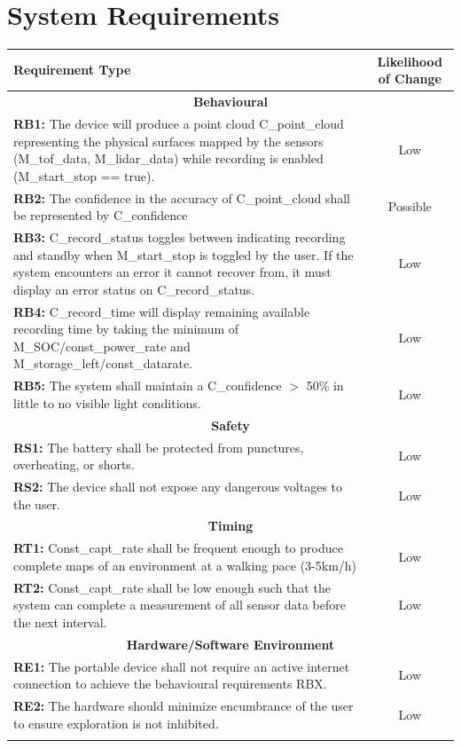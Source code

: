 \documentclass[11pt]{article}
\begin{document}
	\section{System Requirements}
		\begin{tabularx}{\textwidth}{X c}
			\toprule
			\textbf{Requirement Type} & \textbf{Likelihood of Change}\\
			\toprule
			\multicolumn{2}{c}{\textbf{Behavioural}} \\
			\toprule
			\textbf{RB1:} The device will produce a point cloud C\_point\_cloud representing the physical surfaces mapped by the sensors (M\_tof\_data, M\_lidar\_data) while recording is enabled (M\_start\_stop == true).  & Low  \\
			\midrule
			\textbf{RB2:} The confidence in the accuracy of C\_point\_cloud shall be represented by C\_confidence  &  Possible\\
			\midrule
			\textbf{RB3:} C\_record\_status toggles between indicating recording and standby when M\_start\_stop is toggled by the user. If the system encounters an error it cannot recover from, it must display an error status on C\_record\_status.  & Low  \\
			\midrule
			\textbf{RB4:} C\_record\_time will display remaining available recording time by taking the minimum of M\_SOC/const\_power\_rate and M\_storage\_left/const\_datarate.  &  Low \\
			\midrule
			\textbf{RB5:} The system shall maintain a C\_confidence $>$ 50\% in little to no visible light conditions.  &  Low \\
			\toprule
			\multicolumn{2}{c}{\textbf{Safety}} \\
			\toprule
			\textbf{RS1:} The battery shall be protected from punctures, overheating, or shorts.  & Low \\
			\midrule
			\textbf{RS2:} The device shall not expose any dangerous voltages to the user.  & Low \\
			\toprule
			\multicolumn{2}{c}{\textbf{Timing}} \\
			\toprule
			\textbf{RT1:} Const\_capt\_rate shall be frequent enough to produce complete maps of an environment at a walking pace (3-5km/h)  & Low \\
			\midrule
			\textbf{RT2:} Const\_capt\_rate shall be low enough such that the system can complete a measurement of all sensor data before the next interval.  & Low \\
			\toprule
			\multicolumn{2}{c}{\textbf{Hardware/Software Environment}} \\
			\toprule
			\textbf{RE1:} The portable device shall not require an active internet connection to achieve the behavioural requirements RBX.  & Low \\
			\midrule
			\textbf{RE2:} The hardware should minimize encumbrance of the user to ensure exploration is not inhibited.  & Low \\
			\bottomrule
			\caption{Requirement and likeliness to change}
		\end{tabularx}
\end{document}

